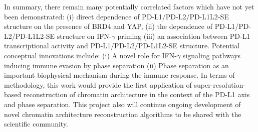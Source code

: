 In summary, there remain many potentially correlated factors which have not yet been demonstrated: (i) direct dependence of PD-L1/PD-L2/PD-L1L2-SE structure on the presence of BRD4 and YAP, (ii) the dependence of PD-L1/PD-L2/PD-L1L2-SE structure on IFN-$\gamma$ priming (iii) an association between PD-L1 transcriptional activity and PD-L1/PD-L2/PD-L1L2-SE structure. Potential conceptual innovations include: (i) A novel role for IFN-$\gamma$ signaling pathways inducing immune evasion by phase separation (ii) Phase separation as an important biophysical mechanism during the immune response. In terms of methodology, this work would provide the first application of super-resolution-based reconstruction of chromatin architecture in the context of the PD-L1 axis and phase separation. This project also will continue ongoing development of novel chromatin architecture reconstruction algorithms to be shared with the scientific community.
